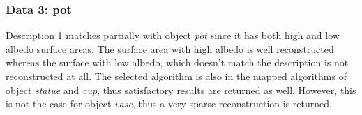 

\subsubsection{Data 3: pot}
Description 1 matches partially with object \textit{pot} since it has both high and low albedo surface areas. The surface area with high albedo is well reconstructed whereas the surface with low albedo, which doesn't match the description is not reconstructed at all. The selected algorithm is also in the mapped algorithms of object \textit{statue} and \textit{cup}, thus satisfactory results are returned as well. However, this is not the case for object \textit{vase}, thus a very sparse reconstruction is returned.

